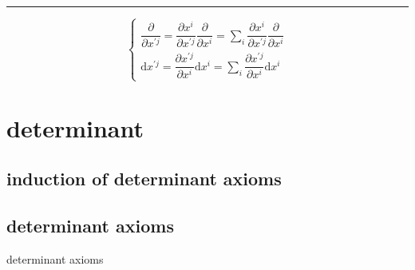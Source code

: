 \documentclass[
]{book}
\theoremstyle{definition}
\theoremstyle{definition}
\theoremstyle{definition}
\theoremstyle{definition}
\theoremstyle{remark}
\begin{document}
\begin{center}\rule{0.5\linewidth}{0.5pt}\end{center}

\[
\begin{cases}
\dfrac{\partial}{\partial x^{\prime{\scriptscriptstyle j}}}=\dfrac{\partial x^{{\scriptscriptstyle i}}}{\partial x^{\prime{\scriptscriptstyle j}}}\dfrac{\partial}{\partial x^{{\scriptscriptstyle i}}}=\sum\limits _{i}\dfrac{\partial x^{{\scriptscriptstyle i}}}{\partial x^{\prime{\scriptscriptstyle j}}}\dfrac{\partial}{\partial x^{{\scriptscriptstyle i}}}\\
\mathrm{d}x^{\prime{\scriptscriptstyle j}}=\dfrac{\partial x^{\prime{\scriptscriptstyle j}}}{\partial x^{{\scriptscriptstyle i}}}\mathrm{d}x^{{\scriptscriptstyle i}}=\sum\limits_{i}\dfrac{\partial x^{\prime{\scriptscriptstyle j}}}{\partial x^{{\scriptscriptstyle i}}}\mathrm{d}x^{{\scriptscriptstyle i}}
\end{cases}
\]

\chapter{determinant}\label{determinant}

\section{induction of determinant axioms}\label{induction-of-determinant-axioms}

\section{determinant axioms}\label{determinant-axioms}

determinant axioms
\end{document}
